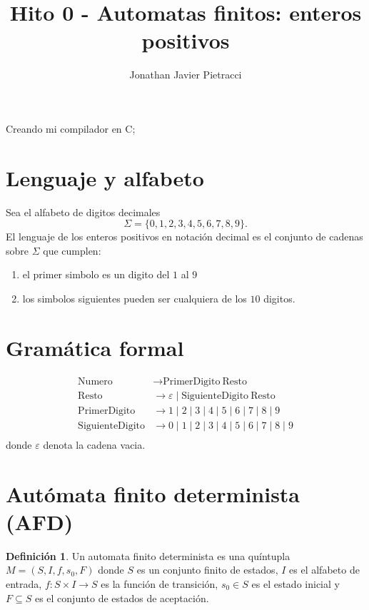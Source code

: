 \documentclass[10pt,a4paper]{article}
\title{Hito 0 - Automatas finitos: enteros positivos}
\author{Jonathan Javier Pietracci}
\theoremstyle{definition}
\newtheorem{definicion}{Definición}[section]
\begin{document}
\maketitle

Creando mi compilador en C;

\section{Lenguaje y alfabeto}

Sea el alfabeto de digitos decimales
\[
\Sigma = \{0,1,2,3,4,5,6,7,8,9\}.
\]
El lenguaje de los enteros positivos en notación decimal es el conjunto de cadenas sobre $\Sigma$ que cumplen:

\begin{enumerate}
    \item el primer simbolo es un digito del $1$ al $9$
    \item los simbolos siguientes pueden ser cualquiera de los $10$ digitos.
\end{enumerate}

\section{Gramática formal}

\begin{align*}
    \text{Numero} &\to \text{PrimerDigito} \ \text{Resto} \\
    \text{Resto} &\to \varepsilon \mid \text{SiguienteDigito} \ \text{Resto} \\
    \text{PrimerDigito} &\to 1 \mid 2 \mid 3 \mid 4 \mid 5 \mid 6 \mid 7 \mid 8 \mid 9 \\
    \text{SiguienteDigito} &\to 0 \mid 1 \mid 2 \mid 3 \mid 4 \mid 5 \mid 6 \mid 7 \mid 8 \mid 9 \\
\end{align*}
donde $\varepsilon$ denota la cadena vacia.

\section{Autómata finito determinista (AFD)}

\begin{definicion}
    Un automata finito determinista es una quíntupla
    $M = (S, I, f, s_0, F)$ donde $S$ es un conjunto finito de estados,
    $I$ es el alfabeto de entrada, $f : S \times I \to S$ es la función de
    transición, $s_0 \in S$ es el estado inicial y $F \subseteq S$ es el
    conjunto de estados de aceptación.
\end{definicion}
\end{document}
